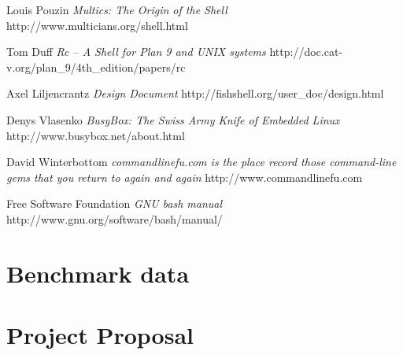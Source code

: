 \documentclass[12pt,twoside,notitlepage]{report}
\begin{document}
\begin{thebibliography}{8} %

  Louis Pouzin
  \emph{Multics: The Origin of the Shell}
  http://www.multicians.org/shell.html

  Tom Duff
  \emph{Rc -- A Shell for Plan 9 and UNIX systems}
  http://doc.cat-v.org/plan\_9/4th\_edition/papers/rc

  Axel Liljencrantz
  \emph{Design Document}
  http://fishshell.org/user\_doc/design.html

  Denys Vlasenko
  \emph{BusyBox: The Swiss Army Knife of Embedded Linux}
  http://www.busybox.net/about.html

  David Winterbottom
  \emph{commandlinefu.com is the place record those command-line gems that
  you return to again and again}
  http://www.commandlinefu.com

  Free Software Foundation
  \emph{GNU bash manual}
  http://www.gnu.org/software/bash/manual/

\end{thebibliography}
\cleardoublepage

\appendix

\chapter{Benchmark data}

\chapter{Project Proposal}

\parindent 0pt
\parskip 6pt

\end{document}
